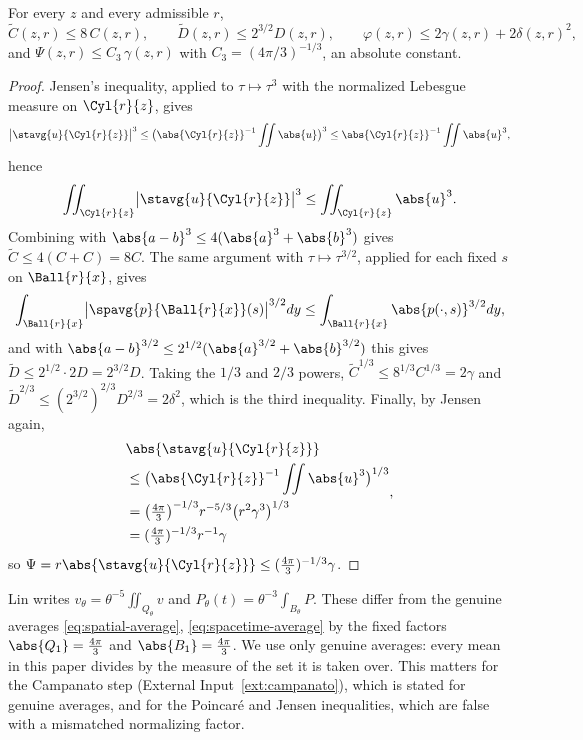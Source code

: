 \documentclass[11pt,reqno]{amsart}
\begin{document}
\begin{lemma}\label{lem:excess-vs}
For every $z$ and every admissible $r$,
\begin{equation}\label{eq:excess-vs-CD}
  \widetilde C(z,r)\le 8\,C(z,r),
  \qquad
  \widetilde D(z,r)\le 2^{3/2}D(z,r),
  \qquad
  \varphi(z,r)\le2\gamma(z,r)+2\delta(z,r)^{2},
\end{equation}
and $\Psi(z,r)\le C_{3}\,\gamma(z,r)$ with $C_{3}=(4\pi/3)^{-1/3}$, an absolute
constant.
\end{lemma}

\begin{proof}
Jensen's inequality, applied to $\tau\mapsto\tau^{3}$ with the normalized
Lebesgue measure on $\Cyl{r}{z}$, gives
\[
\bigl|\stavg{u}{\Cyl{r}{z}}\bigr|^{3}
 \le\bigl(\abs{\Cyl{r}{z}}^{-1}\iint\abs{u}\bigr)^{3}
 \le\abs{\Cyl{r}{z}}^{-1}\iint\abs{u}^{3}
,
\] hence
\[
\iint_{\Cyl{r}{z}}\bigl|\stavg{u}{\Cyl{r}{z}}\bigr|^{3}\le\iint_{\Cyl{r}{z}}\abs{u}^{3}
.
\]
Combining with $\abs{a-b}^{3}\le4(\abs{a}^{3}+\abs{b}^{3})$ gives
$\widetilde C\le4(C+C)=8C$. The same argument with $\tau\mapsto\tau^{3/2}$,
applied for each fixed $s$ on $\Ball{r}{x}$, gives
\[
\int_{\Ball{r}{x}}\bigl|\spavg{p}{\Ball{r}{x}}(s)\bigr|^{3/2}dy
 \le\int_{\Ball{r}{x}}\abs{p(\cdot,s)}^{3/2}dy
,
\] and with
$\abs{a-b}^{3/2}\le2^{1/2}(\abs{a}^{3/2}+\abs{b}^{3/2})$ this gives
$\widetilde D\le2^{1/2}\cdot2D=2^{3/2}D$. Taking the $1/3$ and $2/3$ powers,
$\widetilde C^{1/3}\le8^{1/3}C^{1/3}=2\gamma$ and
$\widetilde D^{2/3}\le(2^{3/2})^{2/3}D^{2/3}=2\delta^{2}$, which is the third
inequality. Finally, by Jensen again,
\[
\begin{aligned}
&\abs{\stavg{u}{\Cyl{r}{z}}}
\\ &\le\bigl(\abs{\Cyl{r}{z}}^{-1}\iint\abs{u}^{3}\bigr)^{1/3}
\\ &=\bigl(\tfrac{4\pi}{3}\bigr)^{-1/3}r^{-5/3}\bigl(r^{2}\gamma^{3}\bigr)^{1/3}
\\ &=(\tfrac{4\pi}{3})^{-1/3}r^{-1}\gamma
\end{aligned}
,
\] so
$\Psi=r\abs{\stavg{u}{\Cyl{r}{z}}}\le(\tfrac{4\pi}{3})^{-1/3}\gamma$.
\end{proof}

\begin{remark}\label{rem:no-lin-normalization}
Lin \cite{Lin1998} writes $v_{\theta}=\theta^{-5}\iint_{Q_{\theta}}v$ and
$P_{\theta}(t)=\theta^{-3}\int_{B_{\theta}}P$. These differ from the genuine
averages \eqref{eq:spatial-average}, \eqref{eq:spacetime-average} by the fixed
factors $\abs{Q_{1}}=\tfrac{4\pi}{3}$ and $\abs{B_{1}}=\tfrac{4\pi}{3}$. We use
only genuine averages: every mean in this paper divides by the measure of the
set it is taken over. This matters for the Campanato step
(External Input~\ref{ext:campanato}), which is stated for genuine averages, and
for the Poincar\'e and Jensen inequalities, which are false with a mismatched
normalizing factor.
\end{remark}
\end{document}
